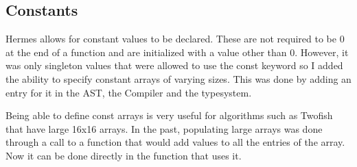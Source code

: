 \subsection{Constants}
Hermes allows for constant values to be declared. These are not required to be 0 at the end of a function and are initialized with a value other than 0. However, it was only singleton values that were allowed to use the const keyword so I added the ability to specify constant arrays of varying sizes. This was done by adding an entry for it in the AST, the Compiler and the typesystem.

Being able to define const arrays is very useful for algorithms such as Twofish that have large 16x16 arrays. In the past, populating large arrays was done through a call to a function that would add values to all the entries of the array. Now it can be done directly in the function that uses it.
